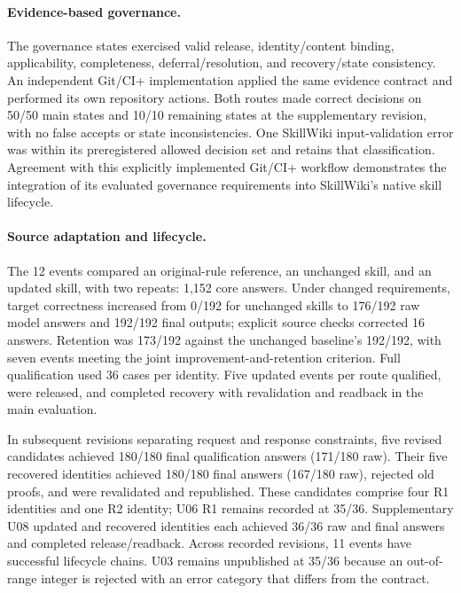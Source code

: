 \paragraph{Evidence-based governance.}
The governance states exercised valid release, identity/content binding,
applicability, completeness, deferral/resolution, and recovery/state consistency.
An independent Git/CI+ implementation applied the same evidence contract and
performed its own repository actions. Both routes made correct decisions on 50/50
main states and 10/10 remaining states at the supplementary revision, with no false
accepts or state inconsistencies. One SkillWiki input-validation error was within
its preregistered allowed decision set and retains that classification. Agreement
with this explicitly implemented Git/CI+ workflow demonstrates the integration of
its evaluated governance requirements into SkillWiki's native skill lifecycle.

\paragraph{Source adaptation and lifecycle.}
The 12 events compared an original-rule reference, an unchanged skill, and an
updated skill, with two repeats: 1,152 core answers. Under changed requirements,
target correctness increased from 0/192 for unchanged skills to 176/192 raw model
answers and 192/192 final outputs; explicit source checks corrected 16 answers.
Retention was 173/192 against the unchanged baseline's 192/192, with seven events
meeting the joint improvement-and-retention criterion. Full qualification used
36 cases per identity. Five updated events per route qualified, were released,
and completed recovery with revalidation and readback in the main evaluation.

In subsequent revisions separating request and response constraints, five revised
candidates achieved 180/180 final qualification answers (171/180 raw). Their five
recovered identities achieved 180/180 final answers (167/180 raw), rejected old
proofs, and were revalidated and republished. These candidates comprise four R1
identities and one R2 identity; U06 R1 remains recorded at 35/36. Supplementary U08
updated and recovered identities each achieved 36/36 raw and final answers and
completed release/readback. Across recorded revisions, 11 events have successful
lifecycle chains. U03 remains unpublished at 35/36 because an out-of-range integer
is rejected with an error category that differs from the contract.

